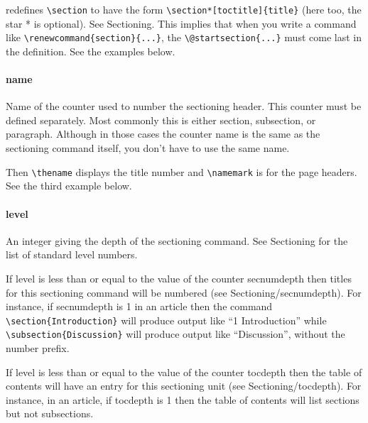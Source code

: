 redefines \verb|\section| to have the form \verb|\section*[toctitle]{title}| (here too, the
star * is optional). See Sectioning. This implies that when you write a command
like \verb|\renewcommand{section}{...}|, the \verb|\@startsection{...}| must come last in the
definition. See the examples below.

\paragraph{name}

Name of the counter used to number the sectioning header. This counter must be
defined separately. Most commonly this is either section, subsection, or
paragraph. Although in those cases the counter name is the same as the
sectioning command itself, you don’t have to use the same name.

Then \verb|\thename| displays the title number and \verb|\namemark| is for the
page headers. See the third example below.

\paragraph{level}

An integer giving the depth of the sectioning command. See Sectioning for the
list of standard level numbers.

If level is less than or equal to the value of the counter secnumdepth then
titles for this sectioning command will be numbered (see
Sectioning/secnumdepth). For instance, if secnumdepth is 1 in an article then
the command \verb|\section{Introduction}| will produce output like ``1
Introduction'' while \verb|\subsection{Discussion}| will produce output like
``Discussion'', without the number prefix.

If level is less than or equal to the value of the counter tocdepth then the table of contents will have an entry for this sectioning unit (see Sectioning/tocdepth). For instance, in an article, if tocdepth is 1 then the table of contents will list sections but not subsections.

